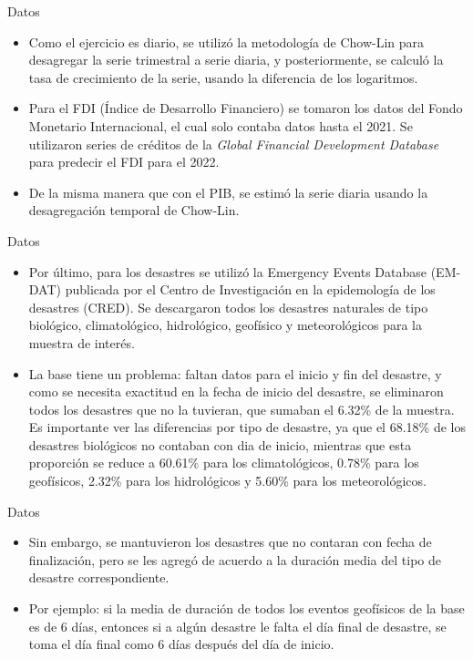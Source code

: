\documentclass{beamer}
\begin{document}
\begin{frame}{Datos}
\begin{itemize}
    \item Como el ejercicio es diario, se utilizó la metodología de Chow-Lin para desagregar la serie trimestral a serie diaria, y posteriormente, se calculó la tasa de crecimiento de la serie, usando la diferencia de los logaritmos.
    \item Para el FDI (Índice de Desarrollo Financiero) se tomaron los datos del Fondo Monetario Internacional, el cual solo contaba datos hasta el 2021. Se utilizaron series de créditos de la \textit{Global Financial Development Database} para predecir el FDI para el 2022.
    \item De la misma manera que con el PIB, se estimó la serie diaria usando la desagregación temporal de Chow-Lin.
\end{itemize}    
\end{frame}

\begin{frame}{Datos}
\begin{itemize}
    \item Por último, para los desastres se utilizó la Emergency Events Database (EM-DAT) publicada por el Centro de Investigación en la epidemología de los desastres (CRED). Se descargaron todos los desastres naturales de tipo biológico, climatológico, hidrológico, geofísico y meteorológicos para la muestra de interés. 
    \item La base tiene un problema: faltan datos para el inicio y fin del desastre, y como se necesita exactitud en la fecha de inicio del desastre, se eliminaron todos los desastres que no la tuvieran, que sumaban el 6.32\% de la muestra. Es importante ver las diferencias por tipo de desastre, ya que el 68.18\% de los desastres biológicos no contaban con dia de inicio, mientras que esta proporción se reduce a 60.61\% para los climatológicos, 0.78\% para los geofísicos, 2.32\% para los hidrológicos y 5.60\% para los meteorológicos. 
\end{itemize}    
\end{frame}

\begin{frame}{Datos}
\begin{itemize}
    \item Sin embargo, se mantuvieron los desastres que no contaran con fecha de finalización, pero se les agregó de acuerdo a la duración media del tipo de desastre correspondiente.
    \item Por ejemplo: si la media de duración de todos los eventos geofísicos de la base es de 6 días, entonces si a algún desastre le falta el día final de desastre, se toma el día final como 6 días después del día de inicio.
    
\end{itemize}    
\end{frame}
\end{document}
